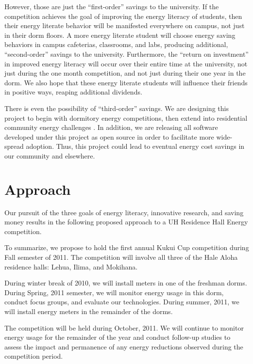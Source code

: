 \documentclass[11pt]{article}
\begin{document}
However, those are just the ``first-order'' savings to the university.  If
the competition achieves the goal of improving the energy literacy of
students, then their energy literate behavior will be manifested everywhere
on campus, not just in their dorm floors.  A more energy literate student
will choose energy saving behaviors in campus cafeterias, classrooms, and
labs, producing additional, ``second-order'' savings to the university.
Furthermore, the ``return on investment'' in improved energy literacy will
occur over their entire time at the university, not just during the one
month competition, and not just during their one year in the dorm.  We also
hope that these energy literate students will influence their friends in
positive ways, reaping additional dividends.

There is even the possibility of ``third-order'' savings.  We are designing
this project to begin with dormitory energy competitions, then extend into
residential community energy challenges \cite{csdl2-09-15}.  In addition,
we are releasing all software developed under this project as open source
in order to facilitate more wide-spread adoption.  Thus, this project could
lead to eventual energy cost savings in our community and elsewhere.

\section{Approach}
\label{sec:approach}

Our pursuit of the three goals of energy literacy, innovative research, and
saving money results in the following proposed approach to a UH Residence Hall
Energy competition.  

To summarize, we propose to hold the first annual Kukui Cup competition
during Fall semester of 2011.  The competition will involve all three of 
the Hale Aloha residence halls: Lehua, Ilima, and Mokihana.

During winter break of 2010, we will install meters in one of the freshman dorms. 
During Spring, 2011 semester, we will monitor energy usage in this dorm, conduct
focus groups, and evaluate our technologies. During summer, 2011, we will install
energy meters in the remainder of the dorms. 

The competition will be held during October, 2011.  We will continue to
monitor energy usage for the remainder of the year and conduct follow-up
studies to assess the impact and permanence of any energy reductions
observed during the competition period.
\end{document}
